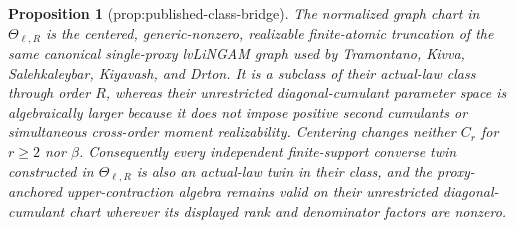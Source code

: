 \documentclass{article}
\newtheorem{proposition}{Proposition}
\begin{document}
\begin{proposition}[prop:published-class-bridge]\label{prop:published-class-bridge}
The normalized graph chart in \(\Theta_{\ell,R}\) is the centered, generic-nonzero, realizable finite-atomic truncation of the same canonical single-proxy lvLiNGAM graph used by Tramontano, Kivva, Salehkaleybar, Kiyavash, and Drton.  It is a subclass of their actual-law class through order \(R\), whereas their unrestricted diagonal-cumulant parameter space is algebraically larger because it does not impose positive second cumulants or simultaneous cross-order moment realizability.  Centering changes neither \(C_r\) for \(r\ge2\) nor \(\beta\).  Consequently every independent finite-support converse twin constructed in \(\Theta_{\ell,R}\) is also an actual-law twin in their class, and the proxy-anchored upper-contraction algebra remains valid on their unrestricted diagonal-cumulant chart wherever its displayed rank and denominator factors are nonzero.
\end{proposition}
\end{document}

